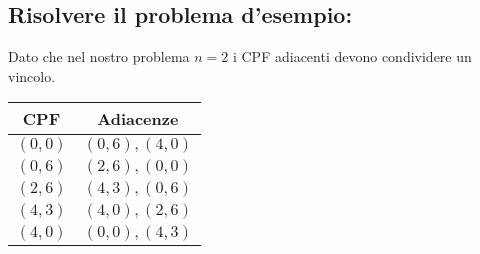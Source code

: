 \documentclass{article}
\begin{document}
\subsection{Risolvere il problema d'esempio:}
\begin{minipage}{0.55\textwidth}
  Dato che nel nostro problema $n=2$ i CPF adiacenti devono condividere un vincolo.
\end{minipage}
\hfill
\begin{minipage}{0.30\textwidth}
  \begin{tabular}{|c|c|}
    \hline
    \textbf{CPF} & \textbf{Adiacenze} \\
    \hline
    $(0,0)$      & $(0,6),(4,0)$      \\
    $(0,6)$      & $(2,6),(0,0)$      \\
    $(2,6)$      & $(4,3),(0,6)$      \\
    $(4,3)$      & $(4,0),(2,6)$      \\
    $(4,0)$      & $(0,0),(4,3)$      \\
    \hline
  \end{tabular}
\end{minipage}
\end{document}

